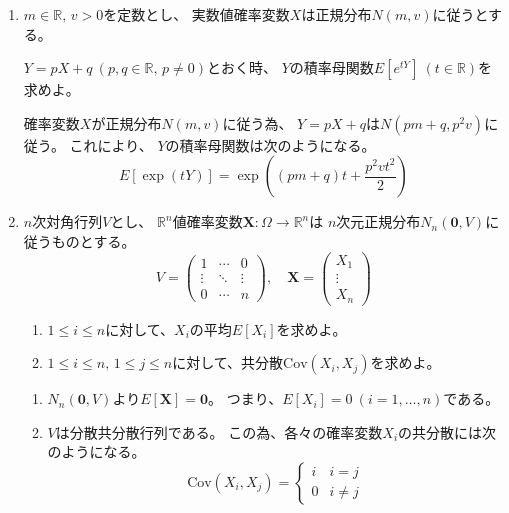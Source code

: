\documentclass[12pt,b5paper]{ltjsarticle}
\begin{document}
\begin{enumerate}
 \item
      $m\in\mathbb{R},\,v>0$を定数とし、
      実数値確率変数$X$は正規分布$N(m,v)$に従うとする。

      $Y=pX+q \ (p,q\in\mathbb{R},\,p\ne0)$とおく時、
      $Y$の積率母関数$E[e^{tY}] \ (t\in\mathbb{R})$を求めよ。

      \dotfill

      確率変数$X$が正規分布$N(m,v)$に従う為、
      $Y=pX+q$は$N(pm+q,p^2v)$に従う。
      これにより、
      $Y$の積率母関数は次のようになる。
      \begin{equation}
       E[\exp(tY)] = \exp\left( (pm+q)t + \frac{p^2vt^2}{2} \right)
      \end{equation}

      \hrulefill

 \item
      $n$次対角行列$V$とし、
      $\mathbb{R}^n$値確率変数$\bm{X}: \Omega\to\mathbb{R}^n$は
      $n$次元正規分布$N_n(\bm{0},V)$に従うものとする。
      \begin{equation}
       V=
       \begin{pmatrix}
        1 & \cdots & 0\\\vdots & \ddots & \vdots\\0 & \cdots & n
       \end{pmatrix},\quad
       \bm{X}=
       \begin{pmatrix}
        X_1\\ \vdots\\ X_n
       \end{pmatrix}
      \end{equation}
      \begin{enumerate}
       \item $1\leq i \leq n$に対して、$X_i$の平均$E[X_i]$を求めよ。
       \item $1\leq i \leq n,\,1\leq j \leq n$に対して、共分散$\mathrm{Cov}(X_i,X_j)$を求めよ。
      \end{enumerate}

      \dotfill

      \begin{enumerate}
       \item $N_n(\bm{0}, V)$より$E[\bm{X}]=\bm{0}$。
             つまり、$E[X_i]=0\ (i=1,\dots,n)$である。
       \item $V$は分散共分散行列である。
             この為、各々の確率変数$X_i$の共分散には次のようになる。
             \begin{equation}
              \mathrm{Cov}(X_i,X_j)=
               \begin{cases}
                i & i=j\\
                0 & i\ne j
               \end{cases}
             \end{equation}
      \end{enumerate}


\end{enumerate}
\end{document}
